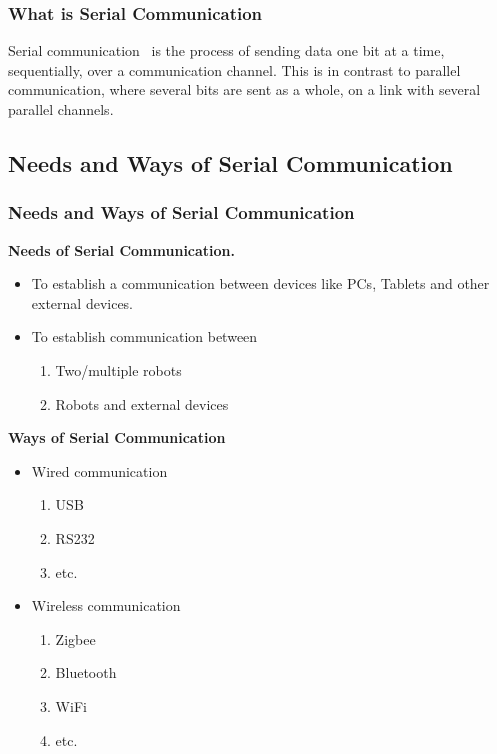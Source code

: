 \documentclass[table,10pt,red]{beamer}	%
\begin{document}
\begin{frame}
	\frametitle{What is Serial Communication}
 	\color{red}Serial communication\color{black} \  is the process of sending data one bit at a time, sequentially, over a communication channel. This is in contrast to parallel communication, where several bits are sent as a whole, on a link with several parallel channels. \\
 		
 		
\end{frame}


\subsection{Needs and Ways of Serial Communication} %

\begin{frame}[shrink]
	\frametitle{Needs and Ways of Serial Communication}
	\textbf{Needs of Serial Communication.} 	
 	\begin{itemize}  %
		\item <+-|alert@+> To establish a communication between devices like PCs, Tablets and other external devices.
		\item <+-|alert@+> To establish communication between 
			\begin{enumerate}
				\item <+-|alert@+> Two/multiple robots
				\item <+-|alert@+> Robots and external devices
			\end{enumerate}
	\end{itemize}
 		
	\textbf{Ways of Serial Communication} 	
 	\begin{itemize}  %
		\pause		
		\item Wired communication
			\begin{enumerate}
				\item <+-|alert@+> USB
				\item <+-|alert@+> RS232
				\item <+-|alert@+> etc.
			\end{enumerate}
		\item Wireless communication
			\begin{enumerate}
				\item <+-|alert@+> Zigbee
				\item <+-|alert@+> Bluetooth
				\item <+-|alert@+> WiFi
				\item <+-|alert@+> etc.				
			\end{enumerate}
	\end{itemize} 		
 		
 		
\end{frame}
\end{document}
